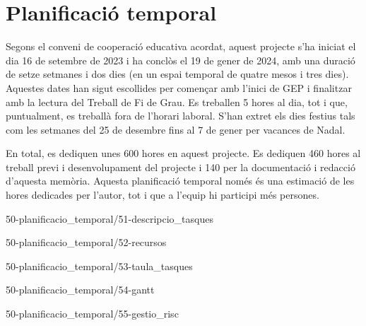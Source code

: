 \chapter{Planificació temporal}

Segons el conveni de cooperació educativa acordat, aquest projecte s'ha iniciat el dia 16 de setembre de 2023 i ha conclòs el 19 de gener de 2024, amb una duració de setze setmanes i dos dies (en un espai temporal de quatre mesos i tres dies). Aquestes dates han sigut escollides per començar amb l'inici de GEP i finalitzar amb la lectura del Treball de Fi de Grau. Es treballen 5 hores al dia, tot i que, puntualment, es treballà fora de l'horari laboral. S'han extret els dies festius tals com les setmanes del 25 de desembre fins al 7 de gener per vacances de Nadal.

En total, es dediquen unes 600 hores en aquest projecte. Es dediquen 460 hores al treball previ i desenvolupament del projecte i 140 per la documentació i redacció d'aquesta memòria. Aquesta planificació temporal només és una estimació de les hores dedicades per l'autor, tot i que a l'equip hi participi més persones.

{50-planificacio_temporal/51-descripcio_tasques}

{50-planificacio_temporal/52-recursos}

{50-planificacio_temporal/53-taula_tasques}

{50-planificacio_temporal/54-gantt}

{50-planificacio_temporal/55-gestio_risc}
